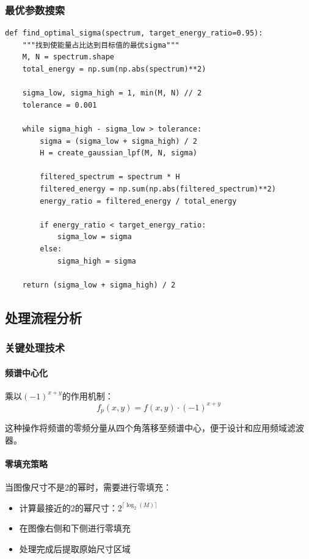 \documentclass[a4paper]{article}
\begin{document}
\subsubsection{最优参数搜索}

\begin{lstlisting}
def find_optimal_sigma(spectrum, target_energy_ratio=0.95):
    """找到使能量占比达到目标值的最优sigma"""
    M, N = spectrum.shape
    total_energy = np.sum(np.abs(spectrum)**2)
    
    sigma_low, sigma_high = 1, min(M, N) // 2
    tolerance = 0.001
    
    while sigma_high - sigma_low > tolerance:
        sigma = (sigma_low + sigma_high) / 2
        H = create_gaussian_lpf(M, N, sigma)
        
        filtered_spectrum = spectrum * H
        filtered_energy = np.sum(np.abs(filtered_spectrum)**2)
        energy_ratio = filtered_energy / total_energy
        
        if energy_ratio < target_energy_ratio:
            sigma_low = sigma
        else:
            sigma_high = sigma
    
    return (sigma_low + sigma_high) / 2
\end{lstlisting}

\subsection{处理流程分析}

\subsubsection{关键处理技术}

\paragraph{频谱中心化}
乘以$(-1)^{x+y}$的作用机制：
$$f_p(x,y) = f(x,y) \cdot (-1)^{x+y}$$

这种操作将频谱的零频分量从四个角落移至频谱中心，便于设计和应用频域滤波器。

\paragraph{零填充策略}
当图像尺寸不是2的幂时，需要进行零填充：
\begin{itemize}
    \item 计算最接近的2的幂尺寸：$2^{\lceil \log_2(M) \rceil}$
    \item 在图像右侧和下侧进行零填充
    \item 处理完成后提取原始尺寸区域
\end{itemize}
\end{document}
